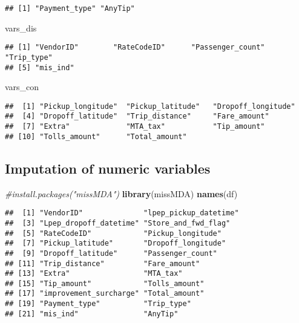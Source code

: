 \documentclass[]{article}
\newenvironment{Shaded}{\begin{snugshade}}{\end{snugshade}}
\newcommand{\KeywordTok}[1]{\textcolor[rgb]{0.13,0.29,0.53}{\textbf{{#1}}}}
\newcommand{\CommentTok}[1]{\textcolor[rgb]{0.56,0.35,0.01}{\textit{{#1}}}}
\newcommand{\NormalTok}[1]{{#1}}
\begin{document}
\begin{verbatim}
## [1] "Payment_type" "AnyTip"
\end{verbatim}

\begin{Shaded}
\begin{Highlighting}[]
\NormalTok{vars_dis}
\end{Highlighting}
\end{Shaded}

\begin{verbatim}
## [1] "VendorID"        "RateCodeID"      "Passenger_count" "Trip_type"      
## [5] "mis_ind"
\end{verbatim}

\begin{Shaded}
\begin{Highlighting}[]
\NormalTok{vars_con}
\end{Highlighting}
\end{Shaded}

\begin{verbatim}
##  [1] "Pickup_longitude"  "Pickup_latitude"   "Dropoff_longitude"
##  [4] "Dropoff_latitude"  "Trip_distance"     "Fare_amount"      
##  [7] "Extra"             "MTA_tax"           "Tip_amount"       
## [10] "Tolls_amount"      "Total_amount"
\end{verbatim}

\subsection{Imputation of numeric
variables}\label{imputation-of-numeric-variables}

\begin{Shaded}
\begin{Highlighting}[]
\CommentTok{#install.packages("missMDA")}
\KeywordTok{library}\NormalTok{(missMDA)}
\KeywordTok{names}\NormalTok{(df)}
\end{Highlighting}
\end{Shaded}

\begin{verbatim}
##  [1] "VendorID"              "lpep_pickup_datetime" 
##  [3] "Lpep_dropoff_datetime" "Store_and_fwd_flag"   
##  [5] "RateCodeID"            "Pickup_longitude"     
##  [7] "Pickup_latitude"       "Dropoff_longitude"    
##  [9] "Dropoff_latitude"      "Passenger_count"      
## [11] "Trip_distance"         "Fare_amount"          
## [13] "Extra"                 "MTA_tax"              
## [15] "Tip_amount"            "Tolls_amount"         
## [17] "improvement_surcharge" "Total_amount"         
## [19] "Payment_type"          "Trip_type"            
## [21] "mis_ind"               "AnyTip"
\end{verbatim}
\end{document}

